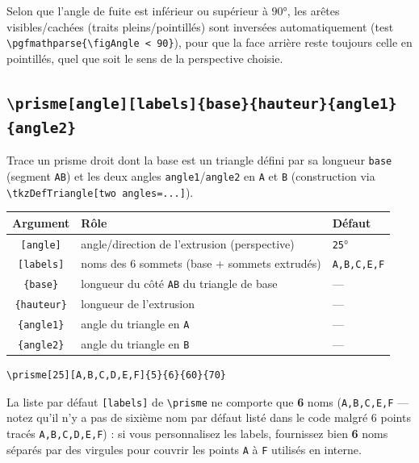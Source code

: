 \documentclass[11pt,a4paper]{article}
\newcommand{\cmdname}[1]{\texttt{\textbackslash#1}}
\begin{document}
\begin{noteFig}
Selon que l'angle de fuite est inférieur ou supérieur à $90°$, les arêtes visibles/cachées (traits pleins/pointillés) sont inversées automatiquement (test \texttt{\textbackslash pgfmathparse\{\textbackslash figAngle < 90\}}), pour que la face arrière reste toujours celle en pointillés, quel que soit le sens de la perspective choisie.
\end{noteFig}

\subsection{\cmdname{prisme[angle][labels]\{base\}\{hauteur\}\{angle1\}\{angle2\}}}

Trace un prisme droit dont la base est un triangle défini par sa longueur \texttt{base} (segment \texttt{AB}) et les deux angles \texttt{angle1}/\texttt{angle2} en \texttt{A} et \texttt{B} (construction via \texttt{\textbackslash tkzDefTriangle[two angles=...]}).

\begin{center}
\begin{tabular}{@{}cll@{}}
\toprule
\textbf{Argument} & \textbf{Rôle} & \textbf{Défaut} \\
\midrule
\texttt{[angle]} & angle/direction de l'extrusion (perspective) & \texttt{25}° \\
\texttt{[labels]} & noms des 6 sommets (base + sommets extrudés) & \texttt{A,B,C,E,F} \\
\texttt{\{base\}} & longueur du côté \texttt{AB} du triangle de base & --- \\
\texttt{\{hauteur\}} & longueur de l'extrusion & --- \\
\texttt{\{angle1\}} & angle du triangle en \texttt{A} & --- \\
\texttt{\{angle2\}} & angle du triangle en \texttt{B} & --- \\
\bottomrule
\end{tabular}
\end{center}

\begin{lstlisting}
\prisme[25][A,B,C,D,E,F]{5}{6}{60}{70}
\end{lstlisting}

\begin{avertissement}
La liste par défaut \texttt{[labels]} de \cmdname{prisme} ne comporte que \textbf{6} noms (\texttt{A,B,C,E,F} — notez qu'il n'y a pas de sixième nom par défaut listé dans le code malgré 6 points tracés \texttt{A,B,C,D,E,F}) : si vous personnalisez les labels, fournissez bien \textbf{6} noms séparés par des virgules pour couvrir les points \texttt{A} à \texttt{F} utilisés en interne.
\end{avertissement}
\end{document}
